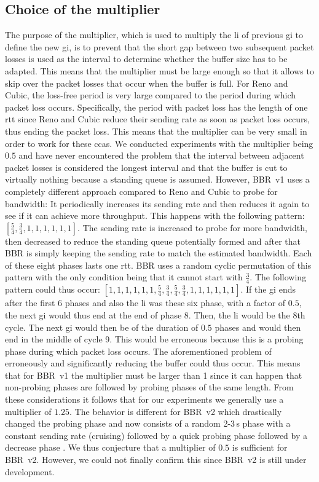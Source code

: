 \documentclass[sigconf, 10pt, letterpaper,dvipsnames\ifx\removeHeaders\tempYes ,nonacm\fi]{acmart}
\begin{document}
\subsection{Choice of the multiplier}

The purpose of the multiplier, which is used to multiply the \gls{li} of previous \gls{gi} to define the new \gls{gi}, is to prevent that the short gap between two subsequent packet losses is used as the interval to determine whether the buffer size has to be adapted. This means that the multiplier must be large enough so that it allows to skip over the packet losses that occur when the buffer is full. For Reno and Cubic, the loss-free period is very large compared to the period during which packet loss occurs. Specifically, the period with packet loss has the length of one \gls{rtt} since Reno and Cubic reduce their sending rate as soon as packet loss occurs, thus ending the packet loss. This means that the multiplier can be very small in order to work for these \glspl{cca}. We conducted experiments with the multiplier being $0.5$ and have never encountered the problem that the interval between adjacent packet losses is considered the longest interval and that the buffer is cut to virtually nothing because a standing queue is assumed. However, BBR~v1 uses a completely different approach compared to Reno and Cubic to probe for bandwidth: It periodically increases its sending rate and then reduces it again to see if it can achieve more throughput. This happens with the following pattern: $[\frac{5}{4},\frac{3}{4},1,1,1,1,1,1]$. The sending rate is increased to probe for more bandwidth, then decreased to reduce the standing queue potentially formed and after that BBR is simply keeping the sending rate to match the estimated bandwidth. Each of these eight phases lasts one \gls{rtt}. BBR uses a random cyclic permutation of this pattern with the only condition being that it cannot start with $\frac{3}{4}$. The following pattern could thus occur: $[1,1,1,1,1,1,\frac{5}{4},\frac{3}{4},\frac{5}{4},\frac{3}{4},1,1,1,1,1,1]$. If the \gls{gi} ends after the first 6 phases and also the \gls{li} was these six phase, with a factor of $0.5$, the next \gls{gi} would thus end at the end of phase 8. Then, the \gls{li} would be the 8th cycle. The next \gls{gi} would then be of the duration of $0.5$ phases and would then end in the middle of cycle 9. This would be erroneous because this is a probing phase during which packet loss occurs. The aforementioned problem of erroneously and significantly reducing the buffer could thus occur. This means that for BBR~v1 the multiplier must be larger than 1 since it can happen that non-probing phases are followed by probing phases of the same length. From these considerations it follows that for our experiments we generally use a multiplier of $1.25$. The behavior is different for BBR~v2 which drastically changed the probing phase and now consists of a random 2-3\,s phase with a constant sending rate (cruising) followed by a quick probing phase followed by a decrease phase \cite{cardwell_bbr_2019}. We thus conjecture that a multiplier of $0.5$ is sufficient for BBR~v2. However, we could not finally confirm this since BBR~v2 is still under development. 
\end{document}
